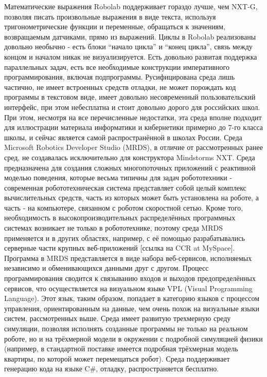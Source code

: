 Математические выражения Robolab поддерживает гораздо лучше, чем NXT-G, позволяя писать произвольные выражения в виде текста, используя тригонометрические функции и переменные, обращаться к значениям, возвращаемым датчиками, прямо из выражений. Циклы в Robolab реализованы довольно необычно - есть блоки “начало цикла” и “конец цикла”, связь между концом и началом никак не визуализируется. Есть довольно развитая поддержка параллельных задач, есть все необходимые конструкции императивного программирования, включая подпрограммы. Русифицирована среда лишь частично, не имеет встроенных средств отладки, не может порождать код программы в текстовом виде, имеет довольно несовременный пользовательский интерфейс, при этом небесплатна и стоит довольно дорого для российских школ. При этом, несмотря на все перечисленные недостатки, эта среда вполне подходит для иллюстрации материала информатики и кибернетики примерно до 7-го класса школы, и сейчас является самой распространённой в школах России.
Среда Microsoft Robotics Developer Studio (MRDS), в отличие от рассмотренных ранее сред, не создавалась исключительно для конструктора Mindstorms NXT. Среда предназначена для создания сложных многопоточных приложений с реактивной моделью поведения, которые весьма типичны для задач робототехники - современная робототехническая система представляет собой целый комплекс вычислительных средств, часть из которых может быть установлена на роботе, а часть - на компьютере, связанном с роботом скоростной сетью. Кроме того, необходимость в высокопроизводительных распределённых программных системах возникает не только в робототехнике, поэтому среда MRDS применяется и в других областях, например, с её помощью разрабатывались серверные части крупных веб-приложений [ссылка на CCR at MySpace]. Программа в MRDS представляется в виде набора веб-сервисов, исполняемых независимо и обменивающихся данными друг с другом. Процесс программирования сводится к связыванию входов и выходов предопределённых сервисов, что осуществляется на визуальном языке VPL (Visual Programming Language). Этот язык, таким образом, попадает в категорию языков с процессом управления, ориентированным на данные, чем очень похож на визуальные языки систем, рассмотренных выше. Среда имеет развитую трехмерную среду симуляции, позволяя исполнять созданные программы не только на реальном роботе, но и на трёхмерной модели в окружении с подробной симуляцией физики (например, в стандартной поставке имеется подробная трёхмерная модель квартиры, по которой может перемещаться робот). Среда поддерживает генерацию кода на языке C#, отладку, распространяется бесплатно.
